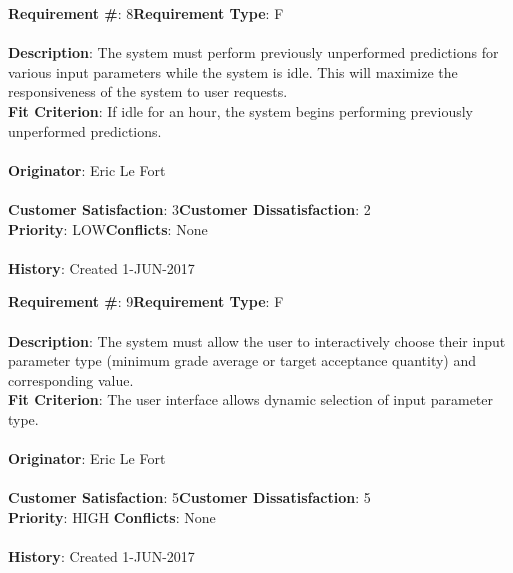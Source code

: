 \documentclass[titlepage]{article}
\begin{document}
\begin{framed}
	\noindent\textbf{Requirement \#}: 8\hfill \textbf{Requirement Type}: F\hfill\\\\
	\noindent\textbf{Description}: The system must perform previously unperformed predictions for various input parameters while the system is idle. This will maximize the responsiveness of the system to user requests.\\
	\textbf{Fit Criterion}: If idle for an hour, the system begins performing previously unperformed predictions.\\\\
	\textbf{Originator}: Eric Le Fort\\\\
	\noindent\textbf{Customer Satisfaction}: 3\hfill \textbf{Customer Dissatisfaction}: 2\hfill\\
	\textbf{Priority}: LOW\hfill \textbf{Conflicts}: None\hfill\\\\
	\noindent\textbf{History}: Created 1-JUN-2017
\end{framed}
\begin{framed}
	\noindent\textbf{Requirement \#}: 9\hfill \textbf{Requirement Type}: F\hfill\\\\
	\noindent\textbf{Description}: The system must allow the user to interactively choose their input parameter type (minimum grade average or target acceptance quantity) and corresponding value.\\
	\textbf{Fit Criterion}: The user interface allows dynamic selection of input parameter type.\\\\
	\textbf{Originator}: Eric Le Fort\\\\
	\noindent\textbf{Customer Satisfaction}: 5\hfill \textbf{Customer Dissatisfaction}: 5\hfill\\
	\textbf{Priority}: HIGH \hfill \textbf{Conflicts}: None\hfill\\\\
	\noindent\textbf{History}: Created 1-JUN-2017
\end{framed}
\newpage
\end{document}
